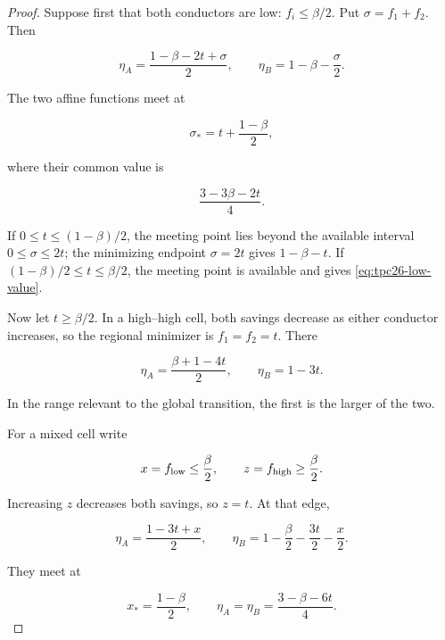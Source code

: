 \begin{proof}
Suppose first that both conductors are low:
\(f_i\le\beta/2\).  Put \(\sigma=f_1+f_2\).  Then

\begin{equation}
 \eta_A=\frac{1-\beta-2t+\sigma}{2},
 \qquad
 \eta_B=1-\beta-\frac\sigma2.
 \label{eq:tpc26-low-low}
\end{equation}

The two affine functions meet at

\begin{equation}
 \sigma_*=t+\frac{1-\beta}{2},
 \label{eq:tpc26-low-witness}
\end{equation}

where their common value is

\begin{equation}
 \frac{3-3\beta-2t}{4}.
 \label{eq:tpc26-low-value}
\end{equation}

If \(0\le t\le(1-\beta)/2\), the meeting point lies beyond the
available interval \(0\le\sigma\le2t\); the minimizing endpoint
\(\sigma=2t\) gives \(1-\beta-t\).  If
\((1-\beta)/2\le t\le\beta/2\), the meeting point is available and
gives \eqref{eq:tpc26-low-value}.

Now let \(t\ge\beta/2\).  In a high--high cell, both savings decrease
as either conductor increases, so the regional minimizer is
\(f_1=f_2=t\).  There

\begin{equation}
 \eta_A=\frac{\beta+1-4t}{2},
 \qquad
 \eta_B=1-3t.
 \label{eq:tpc26-high-high}
\end{equation}

In the range relevant to the global transition, the first is the
larger of the two.

For a mixed cell write

\[
 x=f_{\rm low}\le\frac\beta2,
 \qquad
 z=f_{\rm high}\ge\frac\beta2.
\]

Increasing \(z\) decreases both savings, so \(z=t\).  At that edge,

\begin{equation}
 \eta_A=\frac{1-3t+x}{2},
 \qquad
 \eta_B=1-\frac\beta2-\frac{3t}{2}-\frac x2.
 \label{eq:tpc26-mixed-functions}
\end{equation}

They meet at

\begin{equation}
 x_*=\frac{1-\beta}{2},
 \qquad
 \eta_A=\eta_B=\frac{3-\beta-6t}{4}.
 \label{eq:tpc26-mixed-witness}
\end{equation}


\end{proof}
